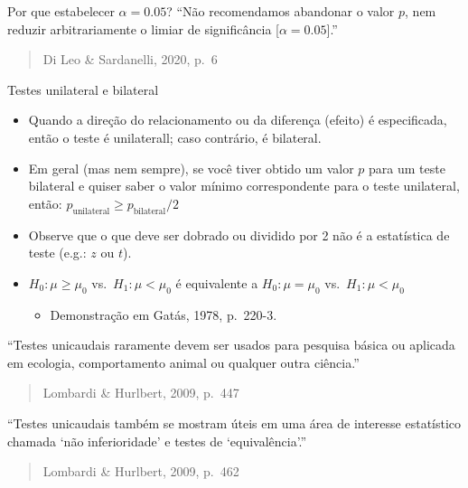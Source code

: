 \documentclass[
  ignorenonframetext,
]{beamer}
\providecommand{\tightlist}{%
  \setlength{\itemsep}{0pt}\setlength{\parskip}{0pt}}
\begin{document}
\begin{frame}{Por que estabelecer \(\alpha = 0.05\)?}
\protect\hypertarget{por-que-estabelecer-alpha-0.05}{}
``Não recomendamos abandonar o valor \(p\), nem reduzir arbitrariamente
o limiar de significância {[}\(\alpha = 0.05\){]}.''

\begin{quote}
Di Leo \& Sardanelli, 2020, p.~6
\end{quote}
\end{frame}

\begin{frame}{Testes unilateral e bilateral}
\protect\hypertarget{testes-unilateral-e-bilateral}{}
\begin{itemize}
\tightlist
\item
  Quando a direção do relacionamento ou da diferença (efeito) é
  especificada, então o teste é unilaterall; caso contrário, é
  bilateral.
\item
  Em geral (mas nem sempre), se você tiver obtido um valor \(p\) para um
  teste bilateral e quiser saber o valor mínimo correspondente para o
  teste unilateral, então:
  \(p_{\text{unilateral}} ≥ p_{\text{bilateral}}/2\)
\item
  Observe que o que deve ser dobrado ou dividido por 2 não é a
  estatística de teste (e.g.: \(z\) ou \(t\)).
\item
  \(H_{0}: \mu \ge \mu_{0}\) vs.~\(H_{1}: \mu < \mu_{0}\) é equivalente
  a \(H_{0}: \mu = \mu_{0}\) vs.~\(H_{1}: \mu < \mu_{0}\)

  \begin{itemize}
  \tightlist
  \item
    Demonstração em Gatás, 1978, p.~220-3.
  \end{itemize}
\end{itemize}

``Testes unicaudais raramente devem ser usados para pesquisa básica ou
aplicada em ecologia, comportamento animal ou qualquer outra ciência.''

\begin{quote}
Lombardi \& Hurlbert, 2009, p.~447
\end{quote}

``Testes unicaudais também se mostram úteis em uma área de interesse
estatístico chamada `não inferioridade' e testes de `equivalência'.''

\begin{quote}
Lombardi \& Hurlbert, 2009, p.~462
\end{quote}
\end{frame}
\end{document}
